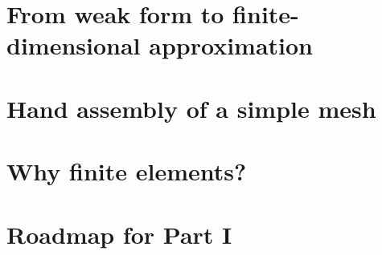 
\section{From weak form to finite-dimensional approximation}
\label{sec:fem_intro:weak_to_discrete}


\section{Hand assembly of a simple mesh}
\label{sec:fem_intro:hand_assembly}


\section{Why finite elements?}
\label{sec:fem_intro:motivation}


\section{Roadmap for Part I}
\label{sec:fem_intro:roadmap}


